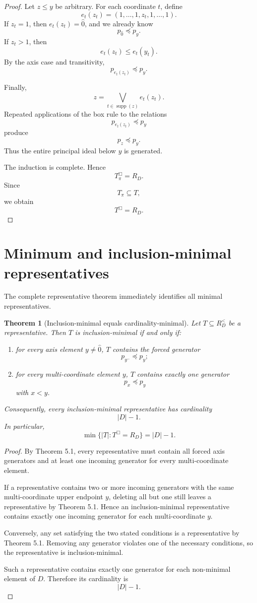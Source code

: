 \documentclass[11pt]{article}
\newtheorem{theorem}{Theorem}[section]
\begin{document}
\begin{proof}
Let $z\le y$ be arbitrary. For each coordinate $t$, define
\[
e_t(z_t)=(1,\dots,1,z_t,1,\dots,1).
\]
If $z_t=1$, then $e_t(z_t)=\hat{0}$, and we already know
\[
p_{\hat{0}}\preceq p_y.
\]
If $z_t>1$, then
\[
e_t(z_t)\le e_t(y_t).
\]
By the axis case and transitivity,
\[
p_{e_t(z_t)}\preceq p_y.
\]

Finally,
\[
z=\bigvee_{t\in\operatorname{supp}(z)} e_t(z_t).
\]
Repeated applications of the box rule to the relations
\[
p_{e_t(z_t)}\preceq p_y
\]
produce
\[
p_z\preceq p_y.
\]
Thus the entire principal ideal below $y$ is generated.

The induction is complete. Hence
\[
T_\pi^\Box=R_D.
\]
Since
\[
T_\pi\subseteq T,
\]
we obtain
\[
T^\Box=R_D.
\]
\end{proof}

\section{Minimum and inclusion-minimal representatives}

The complete representative theorem immediately identifies all minimal representatives.

\begin{theorem}[Inclusion-minimal equals cardinality-minimal]
Let $T\subseteq R_D^{<}$ be a representative. Then $T$ is inclusion-minimal if and only if:
\begin{enumerate}
\item for every axis element $y\ne\hat{0}$,
$T$ contains the forced generator
\[
p_{y^-}\preceq p_y;
\]
\item for every multi-coordinate element $y$, $T$ contains exactly one generator
\[
p_x\preceq p_y
\]
with $x<y$.
\end{enumerate}
Consequently, every inclusion-minimal representative has cardinality
\[
|D|-1.
\]
In particular,
\[
\min\{|T|:T^\Box=R_D\}=|D|-1.
\]
\end{theorem}

\begin{proof}
By Theorem 5.1, every representative must contain all forced axis generators and at least one incoming generator for every multi-coordinate element.

If a representative contains two or more incoming generators with the same multi-coordinate upper endpoint $y$, deleting all but one still leaves a representative by Theorem 5.1. Hence an inclusion-minimal representative contains exactly one incoming generator for each multi-coordinate $y$.

Conversely, any set satisfying the two stated conditions is a representative by Theorem 5.1. Removing any generator violates one of the necessary conditions, so the representative is inclusion-minimal.

Such a representative contains exactly one generator for each non-minimal element of $D$. Therefore its cardinality is
\[
|D|-1.
\]
\end{proof}
\end{document}
